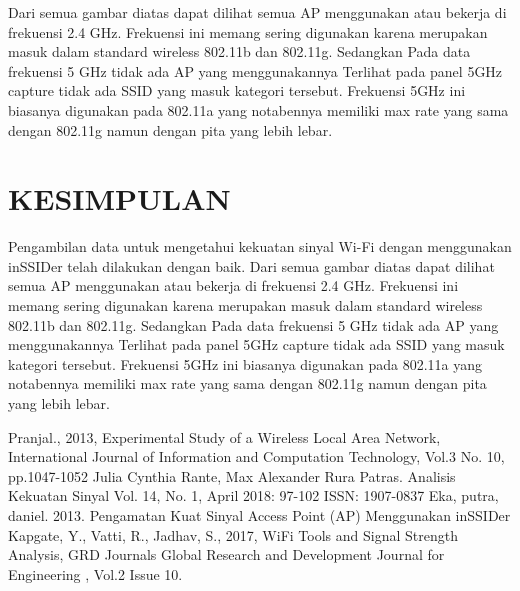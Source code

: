 \documentclass[conference]{IEEEtran}
\begin{document}
\begin{enumerate}
    Dari semua gambar diatas dapat dilihat semua AP menggunakan atau bekerja di frekuensi 2.4 GHz. Frekuensi ini memang sering digunakan karena merupakan masuk dalam standard wireless 802.11b dan 802.11g. Sedangkan Pada data frekuensi 5 GHz tidak ada AP yang menggunakannya Terlihat pada panel 5GHz capture tidak ada SSID yang masuk kategori tersebut. Frekuensi 5GHz ini biasanya digunakan pada 802.11a yang notabennya memiliki max rate yang sama dengan 802.11g namun dengan pita yang lebih lebar.
    \end{enumerate}
    
    \vspace{0.2cm}
    \section{KESIMPULAN}
    \vspace{0.2cm}
    
    Pengambilan data untuk mengetahui kekuatan sinyal Wi-Fi dengan menggunakan inSSIDer telah dilakukan dengan baik. Dari semua gambar diatas dapat dilihat semua AP menggunakan atau bekerja di frekuensi 2.4 GHz. Frekuensi ini memang sering digunakan karena merupakan masuk dalam
    standard wireless 802.11b dan 802.11g. Sedangkan Pada data frekuensi 5 GHz tidak ada AP yang menggunakannya Terlihat pada panel 5GHz capture tidak ada SSID yang masuk kategori tersebut. Frekuensi 5GHz ini biasanya digunakan pada 802.11a yang notabennya memiliki max rate yang sama dengan 802.11g namun dengan pita yang lebih lebar.


\begin{thebibliography}{00}
     Pranjal., 2013, Experimental Study of a Wireless Local Area Network, International Journal of Information and Computation Technology, Vol.3 No. 10, pp.1047-1052
     Julia Cynthia Rante, Max Alexander Rura Patras. Analisis Kekuatan Sinyal Vol. 14, No. 1, April 2018: 97-102 ISSN: 1907-0837
     Eka, putra, daniel. 2013. Pengamatan Kuat Sinyal Access Point (AP) Menggunakan inSSIDer
     Kapgate, Y., Vatti, R., Jadhav, S., 2017, WiFi Tools and Signal Strength Analysis, GRD Journals Global Research and Development Journal for Engineering , Vol.2 Issue 10.
\end{thebibliography}
\end{document}
